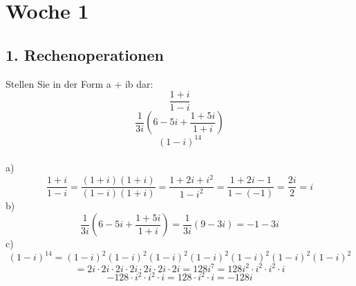 \documentclass{article}
\begin{document}
    \section*{Woche 1}
    \subsection*{1. Rechenoperationen}
    Stellen Sie in der Form a + ib dar:
    \begin{equation*}
        \frac{1+i}{1-i}
    \end{equation*}
    \begin{equation*}
        \frac{1}{3i}\left(6-5i+\frac{1+5i}{1+i}\right)
    \end{equation*}
    \begin{equation*}
        \left(1-i\right)^{14}
    \end{equation*}
    \\
    a) \begin{equation*}
        \frac{1+i}{1-i} = \frac{\left(1+i\right)\left(1+i\right)}{\left(1-i\right)\left(1+i\right)}=\frac{1+2i+i^2}{1-i^2}=\frac{1+2i-1}{1-\left(-1\right)}=\frac{2i}{2}=i
    \end{equation*}
    b) \begin{equation*}
        \frac{1}{3i}\left(6-5i+\frac{1+5i}{1+i}\right)=\frac{1}{3i}\left(9-3i\right)=-1-3i
    \end{equation*}
    c) \begin{equation*}
        \left(1-i\right)^{14}=\left(1-i\right)^2\left(1-i\right)^2\left(1-i\right)^2\left(1-i\right)^2\left(1-i\right)^2\left(1-i\right)^2\left(1-i\right)^2
    \end{equation*}
    \begin{equation*}
        =2i\cdot 2i\cdot 2i\cdot 2i\cdot 2i\cdot 2i\cdot 2i=128i^7=128i^2\cdot i^2\cdot i^2\cdot i
    \end{equation*}
    \begin{equation*}
        -128\cdot i^2\cdot i^2\cdot i=128\cdot i^2\cdot i=-128i
    \end{equation*}
\end{document}
